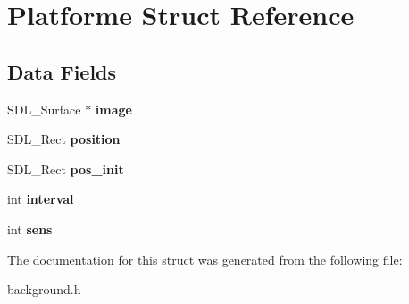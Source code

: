 \hypertarget{structPlatforme}{}\section{Platforme Struct Reference}
\label{structPlatforme}
\subsection*{Data Fields}
\begin{DoxyCompactItemize}
\item 
\mbox{\label{structPlatforme_a1fededad065363039bf9a5969a52819e}} 
S\+D\+L\+\_\+\+Surface $\ast$ {\bfseries image}
\item 
\mbox{\label{structPlatforme_af2c9e89d1a8db9aecbfac2ca8a248407}} 
S\+D\+L\+\_\+\+Rect {\bfseries position}
\item 
\mbox{\label{structPlatforme_a7a50d184a18f9572aee7d2ff3e4ec6ca}} 
S\+D\+L\+\_\+\+Rect {\bfseries pos\+\_\+init}
\item 
\mbox{\label{structPlatforme_a254e58d9278e4a6ec01de25009e86d1b}} 
int {\bfseries interval}
\item 
\mbox{\label{structPlatforme_a7ad73bffce8c77d18d617513f5fc90a9}} 
int {\bfseries sens}
\end{DoxyCompactItemize}


The documentation for this struct was generated from the following file\+:\begin{DoxyCompactItemize}
\item 
background.\+h\end{DoxyCompactItemize}
